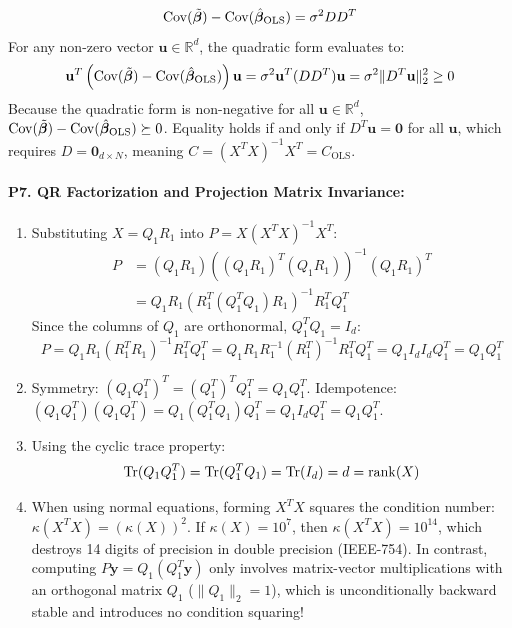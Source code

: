 \begin{enumerate}[label=(\alph*)]
\begin{equation*}
    \operatorname{Cov}(\tilde{\boldsymbol{\beta}}) - \operatorname{Cov}(\hat{\boldsymbol{\beta}}_{\mathrm{OLS}}) = \sigma^2 DD^T
    \end{equation*}
    For any non-zero vector $\mathbf{u} \in \mathbb{R}^d$, the quadratic form evaluates to:
    \begin{equation*}
    \mathbf{u}^T \left( \operatorname{Cov}(\tilde{\boldsymbol{\beta}}) - \operatorname{Cov}(\hat{\boldsymbol{\beta}}_{\mathrm{OLS}}) \right) \mathbf{u} = \sigma^2 \mathbf{u}^T (DD^T) \mathbf{u} = \sigma^2 \|D^T \mathbf{u}\|_2^2 \ge 0
    \end{equation*}
    Because the quadratic form is non-negative for all $\mathbf{u} \in \mathbb{R}^d$, $\operatorname{Cov}(\tilde{\boldsymbol{\beta}}) - \operatorname{Cov}(\hat{\boldsymbol{\beta}}_{\mathrm{OLS}}) \succeq 0$. Equality holds if and only if $D^T \mathbf{u} = \mathbf{0}$ for all $\mathbf{u}$, which requires $D = \mathbf{0}_{d \times N}$, meaning $C = (X^T X)^{-1} X^T = C_{\mathrm{OLS}}$.
\end{enumerate}

\paragraph{P7. QR Factorization and Projection Matrix Invariance:}
\begin{enumerate}[label=(\alph*)]
    \item Substituting $X = Q_1 R_1$ into $P = X(X^T X)^{-1} X^T$:
    \begin{align*}
    P &= (Q_1 R_1) \left( (Q_1 R_1)^T (Q_1 R_1) \right)^{-1} (Q_1 R_1)^T \\
    &= Q_1 R_1 \left( R_1^T (Q_1^T Q_1) R_1 \right)^{-1} R_1^T Q_1^T
    \end{align*}
    Since the columns of $Q_1$ are orthonormal, $Q_1^T Q_1 = I_d$:
    \begin{equation*}
    P = Q_1 R_1 (R_1^T R_1)^{-1} R_1^T Q_1^T = Q_1 R_1 R_1^{-1} (R_1^T)^{-1} R_1^T Q_1^T = Q_1 I_d I_d Q_1^T = Q_1 Q_1^T
    \end{equation*}
    \item Symmetry: $(Q_1 Q_1^T)^T = (Q_1^T)^T Q_1^T = Q_1 Q_1^T$.
    Idempotence: $(Q_1 Q_1^T)(Q_1 Q_1^T) = Q_1 (Q_1^T Q_1) Q_1^T = Q_1 I_d Q_1^T = Q_1 Q_1^T$.
    \item Using the cyclic trace property:
    \begin{equation*}
    \operatorname{Tr}(Q_1 Q_1^T) = \operatorname{Tr}(Q_1^T Q_1) = \operatorname{Tr}(I_d) = d = \operatorname{rank}(X)
    \end{equation*}
    \item When using normal equations, forming $X^T X$ squares the condition number: $\kappa(X^T X) = (\kappa(X))^2$. If $\kappa(X) = 10^7$, then $\kappa(X^T X) = 10^{14}$, which destroys 14 digits of precision in double precision (IEEE-754). In contrast, computing $P\mathbf{y} = Q_1 (Q_1^T \mathbf{y})$ only involves matrix-vector multiplications with an orthogonal matrix $Q_1$ ($\|Q_1\|_2 = 1$), which is unconditionally backward stable and introduces no condition squaring!
\end{enumerate}

